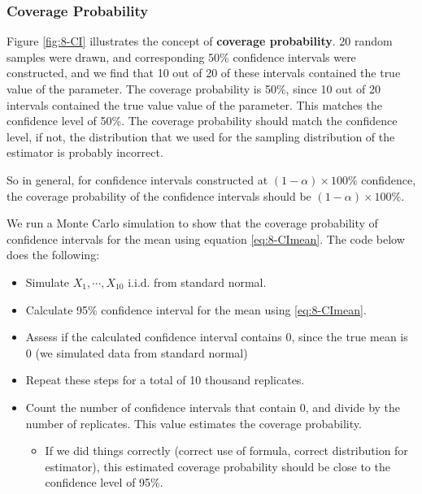 \documentclass[
]{book}
\providecommand{\tightlist}{%
  \setlength{\itemsep}{0pt}\setlength{\parskip}{0pt}}
\begin{document}
\hypertarget{CP}{%
\subsubsection{Coverage Probability}\label{CP}}

Figure \ref{fig:8-CI} illustrates the concept of \textbf{coverage probability}. 20 random samples were drawn, and corresponding 50\% confidence intervals were constructed, and we find that 10 out of 20 of these intervals contained the true value of the parameter. The coverage probability is 50\%, since 10 out of 20 intervals contained the true value value of the parameter. This matches the confidence level of 50\%. The coverage probability should match the confidence level, if not, the distribution that we used for the sampling distribution of the estimator is probably incorrect.

So in general, for confidence intervals constructed at \((1-\alpha) \times 100\%\) confidence, the coverage probability of the confidence intervals should be \((1-\alpha) \times 100\%\).

We run a Monte Carlo simulation to show that the coverage probability of confidence intervals for the mean using equation \eqref{eq:8-CImean}. The code below does the following:

\begin{itemize}
\tightlist
\item
  Simulate \(X_1, \cdots, X_{10}\) i.i.d. from standard normal.
\item
  Calculate 95\% confidence interval for the mean using \eqref{eq:8-CImean}.
\item
  Assess if the calculated confidence interval contains 0, since the true mean is 0 (we simulated data from standard normal)
\item
  Repeat these steps for a total of 10 thousand replicates.
\item
  Count the number of confidence intervals that contain 0, and divide by the number of replicates. This value estimates the coverage probability.

  \begin{itemize}
  \tightlist
  \item
    If we did things correctly (correct use of formula, correct distribution for estimator), this estimated coverage probability should be close to the confidence level of 95\%.
  \end{itemize}
\end{itemize}
\end{document}

